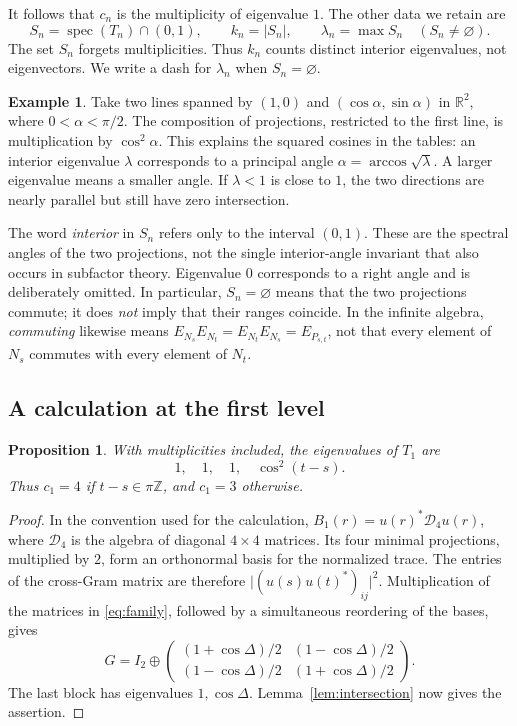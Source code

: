 \documentclass[11pt]{article}
\newtheorem{proposition}[theorem]{Proposition}
\theoremstyle{definition}
\newtheorem{example}[theorem]{Example}
\theoremstyle{remark}
\newcommand{\R}{\mathbb R}
\newcommand{\Z}{\mathbb Z}
\newcommand{\spec}{\operatorname{spec}}
\begin{document}
It follows that \(c_n\) is the multiplicity of eigenvalue \(1\).
The other data we retain are
\begin{equation}\label{eq:interior}
 S_n=\spec(T_n)\cap(0,1),\qquad
 k_n=|S_n|,\qquad \lambda_n=\max S_n\quad(S_n\ne\varnothing).
\end{equation}
The set \(S_n\) forgets multiplicities. Thus \(k_n\) counts distinct
interior eigenvalues, not eigenvectors. We write a dash for
\(\lambda_n\) when \(S_n=\varnothing\).

\begin{example}\label{ex:lines}
Take two lines spanned by \((1,0)\) and
\((\cos\alpha,\sin\alpha)\) in \(\R^2\), where \(0<\alpha<\pi/2\).
The composition of projections, restricted to the first line, is
multiplication by \(\cos^2\alpha\). This explains the squared cosines
in the tables: an interior eigenvalue \(\lambda\) corresponds to a
principal angle \(\alpha=\arccos\sqrt{\lambda}\). A larger eigenvalue
means a smaller angle. If \(\lambda<1\) is close to \(1\), the two
directions are nearly parallel but still have zero intersection.
\end{example}

The word \emph{interior} in \(S_n\) refers only to the interval \((0,1)\).
These are the spectral angles of the two projections, not the single
interior-angle invariant that also occurs in subfactor theory.
Eigenvalue \(0\) corresponds to a right angle and is deliberately
omitted. In particular, \(S_n=\varnothing\) means that the two
projections commute; it does \emph{not} imply that their ranges coincide.
In the infinite algebra, \emph{commuting} likewise means
\(E_{N_s}E_{N_t}=E_{N_t}E_{N_s}=E_{P_{s,t}}\), not that every element
of \(N_s\) commutes with every element of \(N_t\).

\subsection{A calculation at the first level}\label{sec:first}
\begin{proposition}\label{prop:first}
With multiplicities included, the eigenvalues of \(T_1\) are
\[
 1,\quad1,\quad1,\quad\cos^2(t-s).
\]
Thus \(c_1=4\) if \(t-s\in\pi\Z\), and \(c_1=3\) otherwise.
\end{proposition}
\begin{proof}
In the convention used for the calculation,
\(B_1(r)=u(r)^*\mathcal D_4u(r)\), where \(\mathcal D_4\) is the
algebra of diagonal \(4\times4\) matrices. Its four minimal projections,
multiplied by \(2\), form an orthonormal basis for the normalized trace.
The entries of the cross-Gram matrix are therefore
\(\lvert(u(s)u(t)^*)_{ij}\rvert^2\).
Multiplication of the matrices in \eqref{eq:family}, followed by a
simultaneous reordering of the bases, gives
\[
 G=I_2\oplus
 \begin{pmatrix}
 (1+\cos\Delta)/2&(1-\cos\Delta)/2\\
 (1-\cos\Delta)/2&(1+\cos\Delta)/2
 \end{pmatrix}.
\]
The last block has eigenvalues \(1,\cos\Delta\). Lemma~\ref{lem:intersection}
now gives the assertion.
\end{proof}
\end{document}
